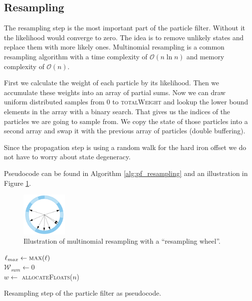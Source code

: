 \subsection{Resampling}

The resampling step is the most important part of the particle filter. Without it the likelihood would converge to zero. The idea is to remove unlikely states and replace them with more likely ones. Multinomial resampling is a common resampling algorithm with a time complexity of $\mathcal{O}(n \ln{n})$ and memory complexity of $\mathcal{O}(n)$.\cite{particle_resample}

First we calculate the weight of each particle by its likelihood. Then we accumulate these weights into an array of partial sums. Now we can draw uniform distributed samples from $0$ to \textsc{totalWeight} and lookup the lower bound elements in the array with a binary search. That gives us the indices of the particles we are going to sample from. We copy the state of those particles into a second array and swap it with the previous array of particles (double buffering).

Since the propagation step is using a random walk for the hard iron offset we do not have to worry about state degeneracy.

Pseudocode can be found in Algorithm \ref{alg:pf_resampling} and an illustration in Figure \ref{fig:pf_resampling}.

\begin{figure}[hbt!]
    \centering
    \includegraphics[width=0.2\textwidth]{figures/multinomial.png}
    \caption{Illustration of multinomial resampling with a ``resampling wheel''.\cite{parallel_resampling}}
    \label{fig:pf_resampling}
\end{figure}

\begin{algorithm}[h]
	$\ell_{max} \leftarrow \textsc{max}(\ell)$\\
	$\mathcal{W}_{sum} \leftarrow 0$\\
	$w \leftarrow$ \textsc{allocateFloats}($n$)\\
	\caption{Resampling step of the particle filter as pseudocode.}
	\label{alg:pf_resampling}
\end{algorithm}

